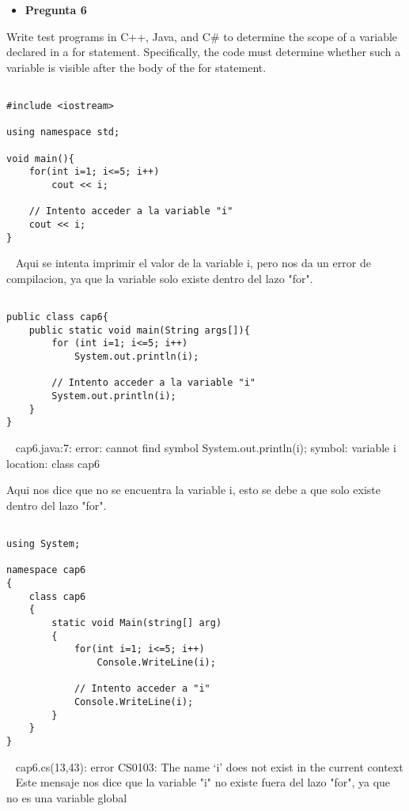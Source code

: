 \documentclass[../main.tex]{subfiles}
\begin{document}
\begin{itemize}
	\item \textbf{Pregunta 6}
\end{itemize}
	Write test programs in C++, Java, and C\# to determine the scope of
	a variable declared in a for statement. Specifically, the code must
	determine whether such a variable is visible after the body of the for
	statement.\newline

\begin{lstlisting}[belowcaptionskip=.5em,caption={C\'odigo en lenguaje C++.}]
	
#include <iostream>

using namespace std;

void main(){
    for(int i=1; i<=5; i++)
        cout << i;
        
    // Intento acceder a la variable "i"
    cout << i;
}
\end{lstlisting}
~\newline
Aqui se intenta imprimir el valor de la variable i, pero nos da un error de compilacion,
ya que la variable solo existe dentro del lazo "for".

\begin{lstlisting}[belowcaptionskip=.5em,caption={C\'odigo en lenguaje Java.}]
	
public class cap6{
    public static void main(String args[]){
        for (int i=1; i<=5; i++)
            System.out.println(i);

        // Intento acceder a la variable "i"
        System.out.println(i);
    }
}
\end{lstlisting}
~\newline
cap6.java:7: error: cannot find symbol System.out.println(i);
  symbol:   variable i
  location: class cap6
  
  Aqui nos dice que no se encuentra la variable i, esto se debe a que solo existe dentro del lazo "for".

\begin{lstlisting}[belowcaptionskip=.5em,caption={C\'odigo en lenguaje C\#.}]
	
using System;

namespace cap6
{
    class cap6
    {
        static void Main(string[] arg)
        {
            for(int i=1; i<=5; i++)
                Console.WriteLine(i);

            // Intento acceder a "i"
            Console.WriteLine(i);
        }
    }
}

\end{lstlisting}
~\newline
cap6.cs(13,43): error CS0103: The name `i' does not exist in the current context
~\newline
Este mensaje nos dice que la variable "i" no existe fuera del lazo "for", ya que no es una variable global
\end{document}
